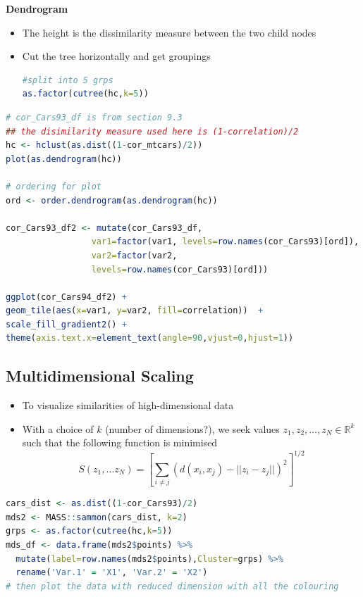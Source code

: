 \documentclass{article}
\begin{document}
\begin{multicols}{2}
\begin{enumerate}
\end{enumerate}
\textbf{Dendrogram}
\begin{itemize}
	\item The height is the dissimilarity measure between the two child nodes
	\item Cut the tree horizontally and get groupings
	\begin{lstlisting}[language=R]
#split into 5 grps
as.factor(cutree(hc,k=5))
\end{lstlisting}
\end{itemize}
\begin{lstlisting}[language=R]
# cor_Cars93_df is from section 9.3
## the disimilarity measure used here is (1-correlation)/2
hc <- hclust(as.dist((1-cor_mtcars)/2))
plot(as.dendrogram(hc))

# ordering for plot
ord <- order.dendrogram(as.dendrogram(hc))

cor_Cars93_df2 <- mutate(cor_Cars93_df,
                 var1=factor(var1, levels=row.names(cor_Cars93)[ord]),
                 var2=factor(var2,
                 levels=row.names(cor_Cars93)[ord]))

ggplot(cor_Cars94_df2) +
geom_tile(aes(x=var1, y=var2, fill=correlation))  +
scale_fill_gradient2() +
theme(axis.text.x=element_text(angle=90,vjust=0,hjust=1))
\end{lstlisting}
\subsection{Multidimensional Scaling}
\begin{itemize}
	\item To visualize similarities of high-dimensional data
	\item With a choice of $k$ (number of dimensions?), we seek values $z_1,z_2,\dots,z_N\in\mathbb{R}^k$ such that the following function is minimised
	$$S(z_1,\dots z_N) = \left[\sum_{i\neq j}(d(x_i,x_j)-||z_i-z_j||)^2\right]^{1/2}$$
\end{itemize}
\begin{lstlisting}[language=R]
cars_dist <- as.dist((1-cor_Cars93)/2)
mds2 <- MASS::sammon(cars_dist, k=2)
grps <- as.factor(cutree(hc,k=5))
mds_df <- data.frame(mds2$points) %>%
  mutate(label=row.names(mds2$points),Cluster=grps) %>%
  rename('Var.1' = 'X1', 'Var.2' = 'X2')
# then plot the data with reduced dimension with all the colouring
\end{lstlisting}

\end{multicols}
\end{document}
